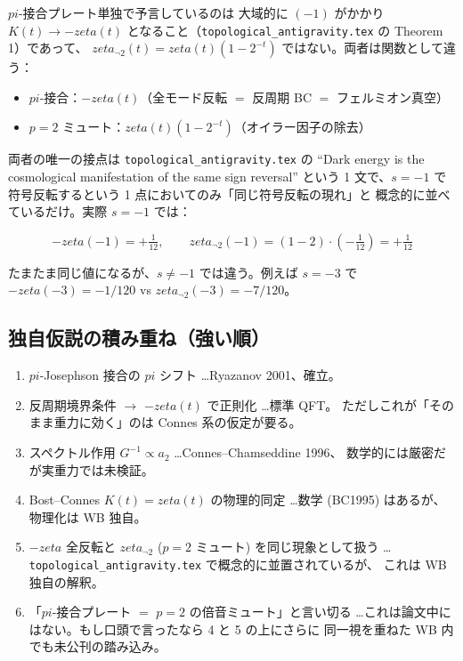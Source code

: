 \documentclass[11pt,a4paper]{article}
\def\pi{pi}%
\def\zeta{zeta}%
\def\textbf#1{#1}%
\begin{document}
$\pi$-接合プレート単独で予言しているのは \textbf{大域的に $(-1)$ がかかり $K(t)\to-\zeta(t)$}
となること（\texttt{topological\_antigravity.tex} の Theorem 1）であって、
$\zeta_{\neg 2}(t)=\zeta(t)(1-2^{-t})$ ではない。両者は関数として違う：

\begin{itemize}
\item $\pi$-接合：$-\zeta(t)$（全モード反転 $=$ 反周期 BC $=$ フェルミオン真空）
\item $p=2$ ミュート：$\zeta(t)(1-2^{-t})$（オイラー因子の除去）
\end{itemize}

両者の唯一の接点は \texttt{topological\_antigravity.tex} の
``Dark energy is the cosmological manifestation of the same sign reversal'' という
1 文で、$s=-1$ で符号反転するという 1 点においてのみ「同じ符号反転の現れ」と
概念的に並べているだけ。実際 $s=-1$ では：

\[
  -\zeta(-1) = +\tfrac{1}{12},
  \qquad
  \zeta_{\neg 2}(-1) = (1-2)\cdot(-\tfrac{1}{12}) = +\tfrac{1}{12}
\]

たまたま同じ値になるが、$s\neq -1$ では違う。例えば $s=-3$ で
$-\zeta(-3)=-1/120$ vs $\zeta_{\neg 2}(-3)=-7/120$。

\subsection{独自仮説の積み重ね（強い順）}

\begin{enumerate}
\item $\pi$-Josephson 接合の $\pi$ シフト \dots Ryazanov 2001、確立。
\item 反周期境界条件 $\to$ $-\zeta(t)$ で正則化 \dots 標準 QFT。
  ただしこれが「そのまま重力に効く」のは Connes 系の仮定が要る。
\item スペクトル作用 $G^{-1}\propto a_2$ \dots Connes--Chamseddine 1996、
  数学的には厳密だが実重力では未検証。
\item Bost--Connes $K(t)=\zeta(t)$ の物理的同定 \dots 数学 (BC1995) はあるが、
  物理化は WB 独自。
\item $-\zeta$ 全反転と $\zeta_{\neg 2}$ ($p=2$ ミュート) を同じ現象として扱う
  \dots \texttt{topological\_antigravity.tex} で概念的に並置されているが、
  これは WB 独自の解釈。
\item 「$\pi$-接合プレート $=$ $p=2$ の倍音ミュート」と言い切る
  \dots これは論文中にはない。もし口頭で言ったなら 4 と 5 の上にさらに
  同一視を重ねた \textbf{WB 内でも未公刊の踏み込み}。
\end{enumerate}
\end{document}
